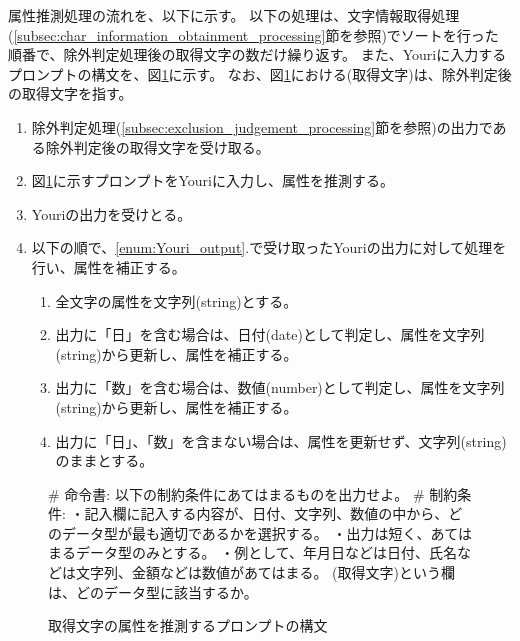 属性推測処理の流れを、以下に示す。
以下の処理は、文字情報取得処理(\ref{subsec:char_information_obtainment_processing}節を参照)でソートを行った順番で、除外判定処理後の取得文字の数だけ繰り返す。
また、Youriに入力するプロンプトの構文を、図\ref{fig:prompt_struct_for_attribute_prediction}に示す。
なお、図\ref{fig:prompt_struct_for_attribute_prediction}における(取得文字)は、除外判定後の取得文字を指す。
\begin{enumerate}
    \item 除外判定処理(\ref{subsec:exclusion_judgement_processing}節を参照)の出力である除外判定後の取得文字を受け取る。
    \item 図\ref{fig:prompt_struct_for_attribute_prediction}に示すプロンプトをYouriに入力し、属性を推測する。
    \item \label{enum:Youri_output}Youriの出力を受けとる。
    \item 以下の順で、\ref{enum:Youri_output}.で受け取ったYouriの出力に対して処理を行い、属性を補正する。
        \begin{enumerate}
            \item 全文字の属性を文字列(string)とする。
            \item 出力に「日」を含む場合は、日付(date)として判定し、属性を文字列(string)から更新し、属性を補正する。
            \item 出力に「数」を含む場合は、数値(number)として判定し、属性を文字列(string)から更新し、属性を補正する。
            \item 出力に「日」、「数」を含まない場合は、属性を更新せず、文字列(string)のままとする。
        \end{enumerate}
\end{enumerate}
\begin{figure}[tp]
    \vbox{
        \vbox{\# 命令書:}
        \vbox{以下の制約条件にあてはまるものを出力せよ。}
        \vbox{\# 制約条件:}
        \vbox{・記入欄に記入する内容が、日付、文字列、数値の中から、どのデータ型が最も適切であるかを選択する。}
        \vbox{・出力は短く、あてはまるデータ型のみとする。}
        \vbox{・例として、年月日などは日付、氏名などは文字列、金額などは数値があてはまる。}
        \vbox{(取得文字)という欄は、どのデータ型に該当するか。}
    }
    \centerline{}
    \caption{取得文字の属性を推測するプロンプトの構文}
    \label{fig:prompt_struct_for_attribute_prediction}
\end{figure}


